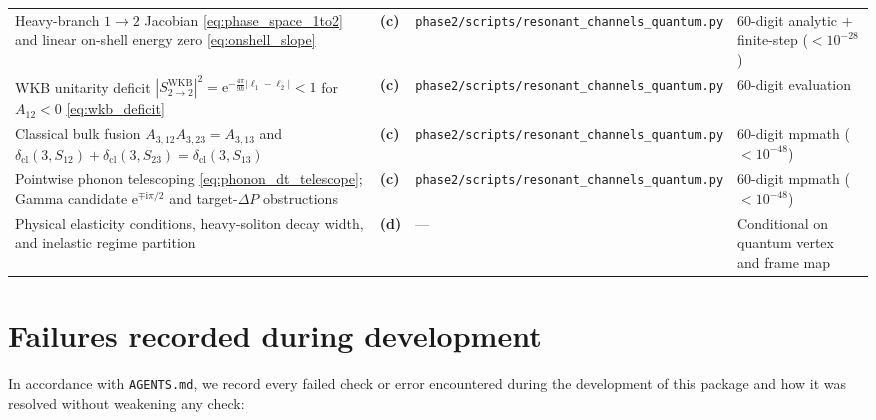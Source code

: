 \documentclass[11pt,a4paper]{article}
\newcommand{\Lc}{\textsf{\textbf{(c)}}\xspace}
\newcommand{\Ld}{\textsf{\textbf{(d)}}\xspace}
\newcommand{\ii}{\mathrm{i}}
\newcommand{\ee}{\mathrm{e}}
\newcommand{\hb}{\hbar}
\newcommand{\squant}{\texttt{phase2/\allowbreak scripts/\allowbreak resonant\_\allowbreak channels\_\allowbreak quantum.py}}
\theoremstyle{remark}
\begin{document}
\begin{longtable}{@{}L{4.8cm}L{1.2cm}L{4.3cm}L{4.2cm}@{}}
Heavy-branch $1\to 2$ Jacobian \eqref{eq:phase_space_1to2} and linear on-shell energy zero \eqref{eq:onshell_slope} & \Lc & \squant & 60-digit analytic $+$ finite-step ($<10^{-28}$) \\
WKB unitarity deficit $|S_{2\to 2}^{\mathrm{WKB}}|^2 = \ee^{-\frac{4\pi}{9\hb}|\ell_1-\ell_2|} < 1$ for $A_{12}<0$ \eqref{eq:wkb_deficit} & \Lc & \squant & 60-digit evaluation \\
Classical bulk fusion $A_{3,12}A_{3,23}=A_{3,13}$ and $\delta_{\mathrm{cl}}(3,S_{12})+\delta_{\mathrm{cl}}(3,S_{23})=\delta_{\mathrm{cl}}(3,S_{13})$ & \Lc & \squant & 60-digit mpmath ($<10^{-48}$) \\
Pointwise phonon telescoping \eqref{eq:phonon_dt_telescope}; Gamma candidate $\ee^{\mp\ii\pi/2}$ and target-$\Delta P$ obstructions & \Lc & \squant & 60-digit mpmath ($<10^{-48}$) \\
Physical elasticity conditions, heavy-soliton decay width, and inelastic regime partition & \Ld & --- & Conditional on quantum vertex and frame map \\\bottomrule
\end{longtable}
\normalsize

\section{Failures recorded during development}
\label{sec:failures}

In accordance with \texttt{AGENTS.md}, we record every failed check or error
encountered during the development of this package and how it was resolved
without weakening any check:
\end{document}

